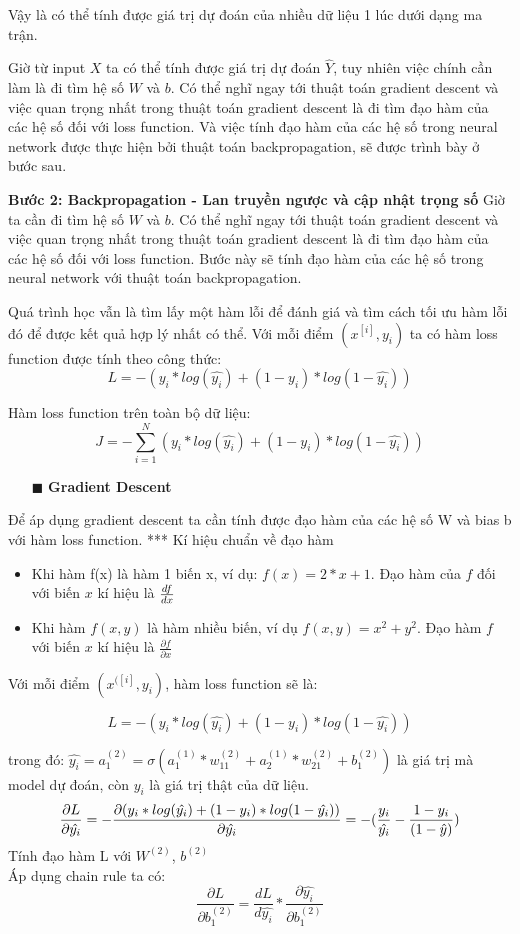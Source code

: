 Vậy là có thể tính được giá trị dự đoán của nhiều dữ liệu 1 lúc dưới dạng ma trận.

Giờ từ input $X$ ta có thể tính được giá trị dự đoán $\hat{Y}$, tuy nhiên việc chính cần làm là đi tìm hệ số $W$ và $b$. Có thể nghĩ ngay tới thuật toán gradient descent và việc quan trọng nhất trong thuật toán gradient descent là đi tìm đạo hàm của các hệ số đối với loss function. Và việc tính đạo hàm của các hệ số trong neural network được thực hiện bởi thuật toán backpropagation, sẽ được trình bày ở bước sau.

\textbf{Bước 2: Backpropagation - Lan truyền ngược và cập nhật trọng số}
Giờ ta cần đi tìm hệ số $W$ và $b$. Có thể nghĩ ngay tới thuật toán gradient descent và việc quan trọng nhất trong thuật toán gradient descent là đi tìm đạo hàm của các hệ số đối với loss function. Bước này sẽ tính đạo hàm của các hệ số trong neural network với thuật toán backpropagation.

Quá trình học vẫn là tìm lấy một hàm lỗi để đánh giá và tìm cách tối ưu hàm lỗi đó để được kết quả hợp lý nhất có thể. Với mỗi điểm $(x^{[i]}, y_i)$ ta có hàm loss function được tính theo công thức: $$L = -(y_i * log(\hat{y_i}) + (1 - y_i) * log(1 - \hat{y_i}))$$

Hàm loss function trên toàn bộ dữ liệu:
$$J = - \sum_{i=1}^{N}(y_i * log(\hat{y_i}) + (1 - y_i) * log(1 - \hat{y_i}))$$

\begin{itemize}
\item[$\blacksquare$] \textbf{Gradient Descent}
\end{itemize}
Để áp dụng gradient descent ta cần tính được đạo hàm của các hệ số W và bias b với hàm loss function.
*** Kí hiệu chuẩn về đạo hàm
\begin{itemize}
\item Khi hàm f(x) là hàm 1 biến x, ví dụ: $ f(x) = 2*x + 1$. Đạo hàm của $f$ đối với biến $x$ kí hiệu là $\frac{df}{dx}\newline $
\item Khi hàm $f(x, y)$ là hàm nhiều biến, ví dụ $ f(x, y) = x^2 + y^2$. Đạo hàm $f$ với biến $x$ kí hiệu là $ \frac{\partial f}{\partial x}$
\end{itemize}

Với mỗi điểm $(x^{([i]}, y_i)$, hàm loss function sẽ là:

$$L = -(y_i * log(\hat{y_i}) + (1 - y_i) * log(1 - \hat{y_i}))$$


trong đó: $\hat{y_i} = a_1^{(2)} = \sigma(a_1^{(1)} * w_{11}^{(2)} + a_2^{(1)} * w_{21}^{(2)} + b_1^{(2)})$
 là giá trị mà model dự đoán, còn $y_i$ là giá trị thật của dữ liệu.
$$\frac{\partial L}{\partial\hat{y_i}} = - \frac{\partial(y_i * log(\hat{y_i}) + (1 - y_i) * log(1 - \hat{y_i}))}{\partial\hat{y_i}}= - (\frac{y_i}{\hat{y_i}} - \frac{1-y_i}{(1-\hat{y})})\newline$$
Tính đạo hàm L với $W^{(2)}$, $b^{(2)}$\\
Áp dụng chain rule ta có: $$ \frac{\partial L}{\partial b_1^{(2)}} = \frac{dL}{d\hat{y_i}} * \frac{\partial\hat{y_i}}{\partial b_1^{(2)} } $$

